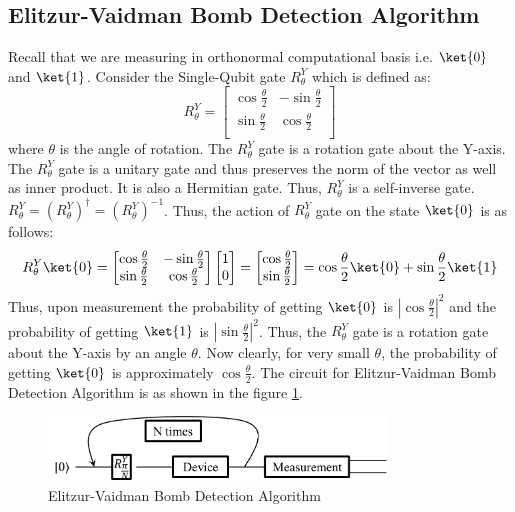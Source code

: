 \documentclass[12pt, oneside]{book}
\theoremstyle{definition}
\theoremstyle{definition}
\theoremstyle{remark}
\begin{document}
\subsection{Elitzur-Vaidman Bomb Detection Algorithm}
    Recall that we are measuring in orthonormal computational basis i.e. $\ket{0}$ and $\ket{1}$. Consider the Single-Qubit gate $R^Y_{\theta}$ which is defined as:
    \[
        R^Y_{\theta}=\begin{bmatrix}
            \cos\frac{\theta}{2} & -\sin\frac{\theta}{2} \\
            \sin\frac{\theta}{2} & \cos\frac{\theta}{2} \\
        \end{bmatrix}
    \]
    where $\theta$ is the angle of rotation. The $R^Y_{\theta}$ gate is a rotation gate about the Y-axis. The $R^Y_{\theta}$ gate is a unitary gate and thus preserves the norm of the vector as well as inner product. It is also a Hermitian gate. Thus, $R^Y_{\theta}$ is a self-inverse gate. $R^Y_{\theta}=(R^Y_{\theta})^{\dagger}=(R^Y_{\theta})^{-1}$.
    Thus, the action of $R^Y_{\theta}$ gate on the state $\ket{0}$ is as follows:
    \[
        R^Y_{\theta}\ket{0}=\begin{bmatrix}
            \cos\frac{\theta}{2} & -\sin\frac{\theta}{2} \\
            \sin\frac{\theta}{2} & \cos\frac{\theta}{2} \\
        \end{bmatrix}\begin{bmatrix}
            1 \\
            0 \\
        \end{bmatrix}=\begin{bmatrix}
            \cos\frac{\theta}{2} \\
            \sin\frac{\theta}{2} \\
        \end{bmatrix}=\cos\frac{\theta}{2}\ket{0}+\sin\frac{\theta}{2}\ket{1}
    \]
    Thus, upon measurement the probability of getting $\ket{0}$ is $|\cos\frac{\theta}{2}|^2$ and the probability of getting $\ket{1}$ is $|\sin\frac{\theta}{2}|^2$. Thus, the $R^Y_{\theta}$ gate is a rotation gate about the Y-axis by an angle $\theta$.
    Now clearly, for very small $\theta$, the probability of getting $\ket{0}$ is approximately $\cos \frac{\theta}{2}$.
    The circuit for Elitzur-Vaidman Bomb Detection Algorithm is as shown in the figure \ref{elitzur}.
    \begin{figure}[H]
        \centering
        \includegraphics[width=0.8\textwidth]{../images/elitzur-vaidmanfinal.png}
        \caption{Elitzur-Vaidman Bomb Detection Algorithm}
        \label{elitzur}
    \end{figure}
\end{document}
